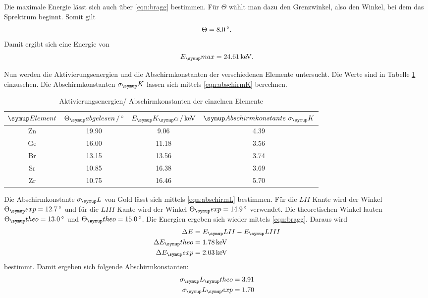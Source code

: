 Die maximale Energie lässt sich auch über \eqref{eqn:bragg} bestimmen. Für $\Theta$
wählt man dazu den Grenzwinkel, also den Winkel, bei dem das Sprektrum beginnt.
Somit gilt
\begin{equation}
  \Theta = 8.0 \,\si{\degree}.
\end{equation}
Damit ergibt sich eine Energie von
\begin{equation}
  E_\su{max} = 24.61 \keV.
\end{equation}

Nun werden die Aktivierungsenergien und die Abschirmkonstanten
der verschiedenen Elemente untersucht. Die
Werte sind in Tabelle \ref{tab:Energie} einzusehen. Die Abschirmkonstanten $\sigma_\su{K}$
lassen sich mittels \eqref{eqn:abschirmK} berechnen.
\begin{table}
  \centering
  \begin{tabular}{c c c c}
    \toprule
    $\su{Element}$ & $\Theta_\su{abgelesen} \,/\dgr$ & $E_\su{K_\su{\alpha}}\,/ \keV$ & $\su{Abschirmkonstante}\,\,\sigma_\su{K}$\\
    \midrule
    Zn & 19.90 &  9.06 & 4.39 &  \\
    Ge & 16.00 & 11.18 & 3.56 &  \\
    Br & 13.15 & 13.56 & 3.74 &  \\
    Sr & 10.85 & 16.38 & 3.69 &  \\
    Zr & 10.75 & 16.46 & 5.70 &  \\
    \bottomrule
  \end{tabular}
  \caption{Aktivierungsenergien/ Abschirmkonstanten der einzelnen Elemente}
  \label{tab:Energie}
\end{table}
Die Abschirmkonstante $\sigma_\su{L}$
von Gold lässt sich mittels \eqref{eqn:abschirmL} bestimmen.
Für die $LII$ Kante wird der Winkel $\Theta_\su{exp} = 12.7 \dgr$ und für die $LIII$ Kante
wird der Winkel $\Theta_\su{exp} = 14.9 \dgr$ verwendet. Die theoretischen Winkel lauten
$\Theta_\su{theo} = 13.0 \dgr$ und $\Theta_\su{theo} = 15.0 \dgr$.
Die Energien ergeben sich wieder mittels \eqref{eqn:bragg}. Daraus wird
\begin{align*}
  \Delta E &= E_\su{LII} - E_\su{LIII} \\
  \Delta E_\su{theo} &= 1.78 \keV \\
  \Delta E_\su{exp} &= 2.03 \keV \\
\end{align*}
bestimmt.
Damit ergeben sich folgende Abschirmkonstanten:
\begin{align*}
  \sigma_\su{L}_\su{theo} &= 3.91  \\
  \sigma_\su{L}_\su{exp} &= 1.70 \\
\end{align*}

